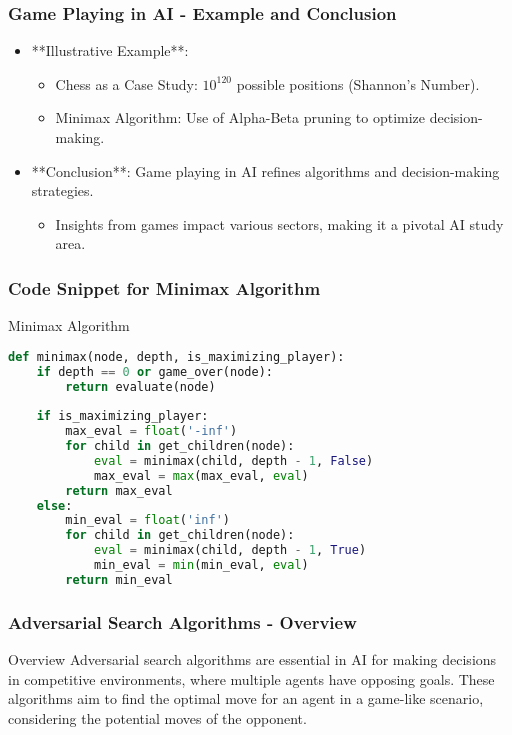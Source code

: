 \documentclass[aspectratio=169]{beamer}
\begin{document}
\begin{frame}[fragile]
    \frametitle{Game Playing in AI - Example and Conclusion}
    \begin{itemize}
        \item **Illustrative Example**: 
        \begin{itemize}
            \item Chess as a Case Study: \( 10^{120} \) possible positions (Shannon's Number).
            \item Minimax Algorithm: Use of Alpha-Beta pruning to optimize decision-making.
        \end{itemize}
        \item **Conclusion**: Game playing in AI refines algorithms and decision-making strategies.
        \begin{itemize}
            \item Insights from games impact various sectors, making it a pivotal AI study area.
        \end{itemize}
    \end{itemize}
\end{frame}

\begin{frame}[fragile]
    \frametitle{Code Snippet for Minimax Algorithm}
    \begin{block}{Minimax Algorithm}
    \begin{lstlisting}[language=Python]
def minimax(node, depth, is_maximizing_player):
    if depth == 0 or game_over(node):
        return evaluate(node)
    
    if is_maximizing_player:
        max_eval = float('-inf')
        for child in get_children(node):
            eval = minimax(child, depth - 1, False)
            max_eval = max(max_eval, eval)
        return max_eval
    else:
        min_eval = float('inf')
        for child in get_children(node):
            eval = minimax(child, depth - 1, True)
            min_eval = min(min_eval, eval)
        return min_eval
    \end{lstlisting}
    \end{block}
\end{frame}

\begin{frame}[fragile]
    \frametitle{Adversarial Search Algorithms - Overview}
    \begin{block}{Overview}
        Adversarial search algorithms are essential in AI for making decisions in competitive environments, where multiple agents have opposing goals. These algorithms aim to find the optimal move for an agent in a game-like scenario, considering the potential moves of the opponent.
    \end{block}
\end{frame}
\end{document}
